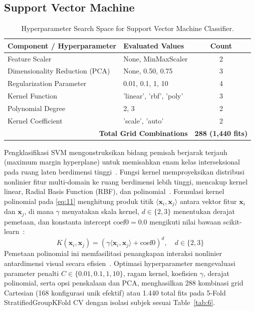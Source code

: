 \subsection{Support Vector Machine}
\label{sec:support_vector_machine_classifier}
\label{sec:support_vector_machine}

\begin{table}[htbp]
\caption{Hyperparameter Search Space for Support Vector Machine Classifier.}
\label{tab:6}
\label{tab:VI}
\label{tab:svm_params}
\centering
\footnotesize
\begin{tabular}{llc}
\toprule
Component / Hyperparameter & Evaluated Values & Count \\
\midrule
Feature Scaler & None, MinMaxScaler & 2 \\
Dimensionality Reduction (PCA) & None, 0.50, 0.75 & 3 \\
Regularization Parameter & 0.01, 0.1, 1, 10 & 4 \\
Kernel Function & 'linear', 'rbf', 'poly' & 3 \\
Polynomial Degree & 2, 3 & 2 \\
Kernel Coefficient & 'scale', 'auto' & 2 \\
\midrule
\multicolumn{2}{r}{\textbf{Total Grid Combinations}} & \textbf{288 (1,440 fits)} \\
\bottomrule
\end{tabular}
\end{table}

Pengklasifikasi SVM mengonstruksikan bidang pemisah berjarak terjauh (maximum margin hyperplane) untuk memisahkan enam kelas interseksional pada ruang laten berdimensi tinggi~\cite{ref40}. Fungsi kernel memproyeksikan distribusi nonlinier fitur multi-domain ke ruang berdimensi lebih tinggi, mencakup kernel linear, Radial Basis Function (RBF), dan polinomial~\cite{ref41}. Formulasi kernel polinomial pada \eqref{eq:11} menghitung produk titik $\langle \mathbf{x}_i, \mathbf{x}_j \rangle$ antara vektor fitur $\mathbf{x}_i$ dan $\mathbf{x}_j$, di mana $\gamma$ menyatakan skala kernel, $d \in \{2, 3\}$ menentukan derajat pemetaan, dan konstanta intercept $\text{coef0} = 0.0$ mengikuti nilai bawaan scikit-learn~\cite{ref42}:
\begin{equation}
K(\mathbf{x}_i, \mathbf{x}_j) = (\gamma \langle \mathbf{x}_i, \mathbf{x}_j \rangle + \text{coef0})^d, \quad d \in \{2, 3\}
\label{eq:11}
\end{equation}
Pemetaan polinomial ini memfasilitasi penangkapan interaksi nonlinier antardimensi visual secara efisien~\cite{ref43}. Optimasi hyperparameter mengevaluasi parameter penalti $C \in \{0.01, 0.1, 1, 10\}$, ragam kernel, koefisien $\gamma$, derajat polinomial, serta opsi penskalaan dan PCA, menghasilkan 288 kombinasi grid Cartesian (168 konfigurasi unik efektif) atau 1.440 total fits pada 5-Fold StratifiedGroupKFold CV dengan isolasi subjek sesuai Table~\ref{tab:6}.

